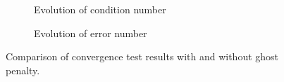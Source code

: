 \begin{figure}[h!]
    \centering
    \begin{subfigure}{0.49\textwidth}
        \centering
        
        \caption{Evolution of condition number}
        \label{subfig:cond}
    \end{subfigure}
    \hfill
    \begin{subfigure}{0.49\textwidth}
        \centering
        
        \caption{Evolution of error number}
        \label{subfig:error}
    \end{subfigure}
    \caption{Comparison of convergence test results with and without ghost penalty.}
    \label{fig:combined}
\end{figure}

